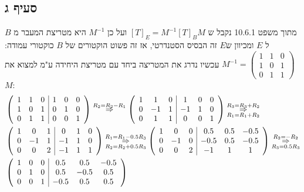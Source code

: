 \documentclass{article}
\begin{document}
	\subsection*{סעיף ג}
	מתוך משפט 10.6.1 נקבל ש $[T]_E = M^{-1}[T]_BM$ ועל כן $M^{-1}$ היא מטריצת המעבר מ $B$ ל $E$ ומכיוון ש$E$ זה הבסיס הסטנדרטי, אז זה פשוט הוקטורים של $B$ כוקטורי עמודה:
	$M^{-1} = \begin{pmatrix}
		1 & 1 & 0 \\
		1 & 0 & 1 \\
		0 & 1 & 1
	\end{pmatrix}$
	עכשיו נדרג את המטריצה ביחד עם מטריצת היחידה ע"מ למצוא את $M$:
	\begin{align*}
		&\left( \begin{array}{ccc|ccc}
			1 & 1 & 0 & 1 & 0 & 0\\
			1 & 0 & 1 & 0 & 1 & 0\\
			0 & 1 & 1 & 0 & 0 & 1 \\
		\end{array} \right) \overset{R_2 = R_2 - R_1}\Rightarrow
		\left( \begin{array}{ccc|ccc}
			1 & 1 & 0 & 1 & 0 & 0\\
			0 & -1 & 1 & -1 & 1 & 0\\
			0 & 1 & 1 & 0 & 0 & 1 \\
		\end{array} \right) \overset{R_3 = R_3 + R_2}{\underset{R_1 = R_1 + R_2}\Rightarrow} \\
		&\left( \begin{array}{ccc|ccc}
			1 & 0 & 1 & 0 & 1 & 0\\
			0 & -1 & 1 & -1 & 1 & 0\\
			0 & 0 & 2 & -1 & 1 & 1 \\
		\end{array} \right) \overset{R_1 = R_1 - 0.5R_3}{\underset{R_2 = R_2 + 0.5R_3}\Rightarrow}
		\left( \begin{array}{ccc|ccc}
			1 & 0 & 0 & 0.5 & 0.5 & -0.5\\
			0 & -1 & 0 & -0.5 & 0.5 & -0.5 \\
			0 & 0 & 2 & -1 & 1 & 1 \\
		\end{array} \right) \overset{R_2 = -R_2}{\underset{R_3 = 0.5R_3}\Rightarrow} \\
		&\left( \begin{array}{ccc|ccc}
			1 & 0 & 0 & 0.5 & 0.5 & -0.5\\
			0 & 1 & 0 & 0.5 & -0.5 & 0.5 \\
			0 & 0 & 1 & -0.5 & 0.5 & 0.5 \\
		\end{array} \right)
	\end{align*}
\end{document}
